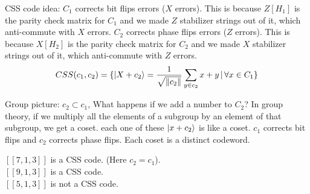 CSS code idea: $C_1$ corrects bit flips errors ($X$ errors).  This is because $Z[H_1]$ is the parity check matrix for $C_1$ and we made $Z$ stabilizer strings out of it, which anti-commute with $X$ errors. $C_2$ corrects phase flips errors ($Z$ errors). This is because $X[H_2]$ is the parity check matrix for $C_2$ and we made $X$ stabilizer strings out of it, which anti-commute with $Z$ errors. 
\begin{equation}
    CSS(c_1,c_2) = \{\ket{X + c_2} = \frac{1}{\sqrt{\norm{c_2}}} \sum_{y \in c_2} x+y \,|\, \forall x \in C_1\}
\end{equation}


Group picture: $c_2 \subset c_1$, What happens if we add a number to $C_2$? In group theory, if we multiply all the elements of a subgroup by an element of that subgroup, we get a coset. each one of these $\ket{x+c_2}$ is like a coset. $c_1$ corrects bit flips and $c_2$ corrects phase flips. Each coset is a distinct codeword. 

\begin{example}
    $[[7,1,3]]$ is a CSS code. (Here $c_2 = c_1$). \\
    $[[9,1,3]]$ is a CSS code. \\
    $[[5,1,3]]$ is not a CSS code. \\
\end{example}